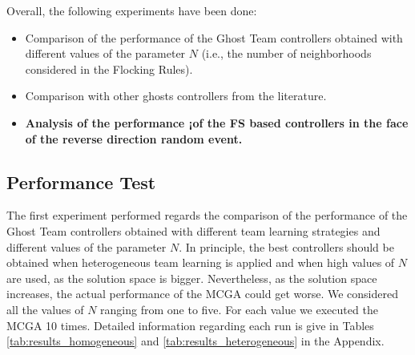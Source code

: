 \documentclass[journal]{IEEEtran}
\begin{document}
Overall, the following experiments have been done:

\begin{itemize}
  \item Comparison of the performance of the Ghost Team controllers obtained with different values of the parameter $N$ (i.e., the number of neighborhoods considered in the Flocking Rules).
  \item Comparison with other ghosts controllers from the literature.
  \item \textbf{Analysis of the performance ¡of the FS based controllers in the face of the reverse direction random event.}
\end{itemize}

\subsection{Performance Test}
The first experiment performed regards the comparison of the performance of the Ghost Team controllers obtained with different team learning strategies and different values of the parameter $N$. In principle, the best controllers should be obtained when heterogeneous team learning is applied and when high values of $N$ are used, as the solution space is bigger. Nevertheless, as the solution space increases, the actual performance of the MCGA could get worse. We considered all the values of $N$ ranging from one to five. For each value we executed the MCGA 10 times. Detailed information regarding each run is give in Tables \ref{tab:results_homogeneous} and \ref{tab:results_heterogeneous} in the Appendix.
\end{document}
